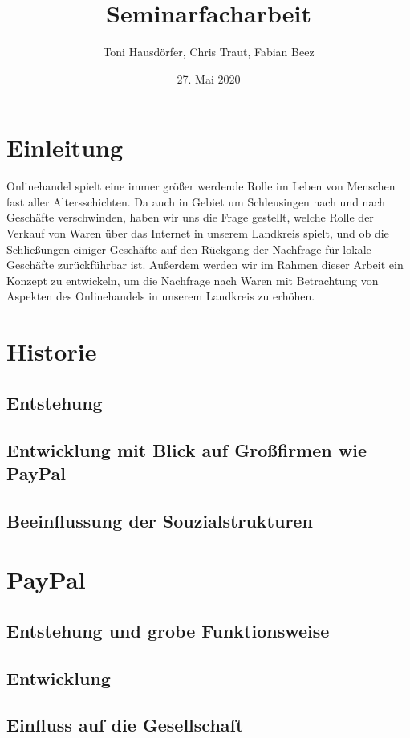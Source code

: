 \documentclass[a4paper, 10pt]{scrartcl}
\title{Seminarfacharbeit}
\author{Toni Hausdörfer, Chris Traut, Fabian Beez}
\date{27. Mai 2020}
\begin{document}
    
    \maketitle \newpage
    \tableofcontents \newpage

    \section{Einleitung}
Onlinehandel spielt eine immer größer werdende Rolle im Leben von Menschen fast aller Altersschichten. Da auch in Gebiet um Schleusingen nach und nach Geschäfte verschwinden, haben wir uns die Frage gestellt, welche Rolle der Verkauf von Waren über das Internet in unserem Landkreis spielt, und ob die Schließungen einiger Geschäfte auf den Rückgang der Nachfrage für lokale Geschäfte zurückführbar ist.
Außerdem werden wir im Rahmen dieser Arbeit ein Konzept zu entwickeln, um die Nachfrage nach Waren mit Betrachtung von Aspekten des Onlinehandels in unserem Landkreis zu erhöhen. 
\newpage
    
    \section{Historie}
        \subsection{Entstehung}
        \subsection{Entwicklung mit Blick auf Großfirmen wie PayPal}
        \subsection{Beeinflussung der Souzialstrukturen}
        
    \section{PayPal}
        \subsection{Entstehung und grobe Funktionsweise}
        \subsection{Entwicklung}
        \subsection{Einfluss auf die Gesellschaft}
        
\end{document}
